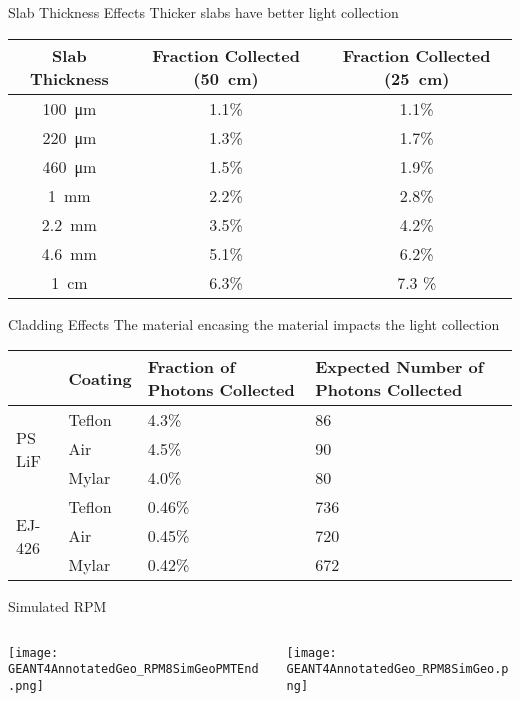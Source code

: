 \begin{frame}{Slab Thickness Effects}
Thicker slabs have better light collection
\begin{table}
	\small
  \begin{tabular}{c | c  c}
	\toprule
	Slab Thickness & Fraction Collected (\SI{50}{\cm}) & Fraction Collected (\SI{25}{\cm}) \\
	\midrule
	\SI{100}{\um} & 1.1\% & 1.1\% \\
	\SI{220}{\um} & 1.3\% & 1.7\% \\
	\SI{460}{\um} & 1.5\% & 1.9\% \\
	\SI{1}{\mm} & 2.2\% & 2.8\% \\
	\SI{2.2}{\mm} & 3.5\% & 4.2\% \\
	\SI{4.6}{\mm} & 5.1\% & 6.2\% \\
	\SI{1}{\cm} & 6.3\% & 7.3 \% \\
	\bottomrule
	\end{tabular}
\end{table}
\end{frame}
\begin{frame}{Cladding Effects}
The material encasing the material impacts the light collection
\begin{table}
  \small
  \begin{tabular}{p{1.5cm} m{1.5cm} m{3cm} m{3cm}}
  \toprule
  & Coating & Fraction of Photons Collected & Expected Number of Photons Collected \\
  \midrule 
  \multirow{3}{*}{PS LiF} & Teflon & 4.3\% & 86\\
  				      & Air & 4.5\% & 90\\
				      & Mylar & 4.0\% & 80\\
  \midrule 
  \multirow{3}{*}{EJ-426} & Teflon & 0.46\% &736\\
  				      & Air & 0.45\% & 720\\
				      & Mylar & 0.42\% & 672 \\
 \bottomrule				 	   				  
 \end{tabular}
\end{table}
\end{frame}
\begin{frame}{Simulated RPM}
  \begin{columns}[onlytextwidth]
    \begin{column}{0.45\textwidth}
		\texttt{[image: GEANT4AnnotatedGeo\_RPM8SimGeoPMTEnd.png]}
    \end{column}
    \begin{column}{0.45\textwidth}
		\texttt{[image: GEANT4AnnotatedGeo\_RPM8SimGeo.png]}
    \end{column}
  \end{columns}
\end{frame}
